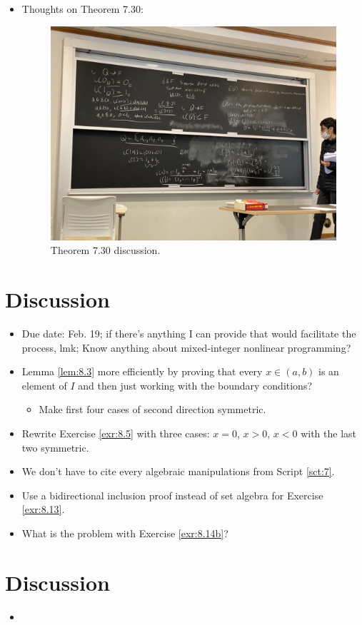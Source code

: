 \documentclass{report}
\begin{document}
\begin{itemize}
    \item {}Thoughts on Theorem 7.30:
    \begin{figure}[h!]
        \centering
        \includegraphics[width=0.5\linewidth]{ExtFiles/theorem7-30.JPG}
        \caption{Theorem 7.30 discussion.}
        \label{fig:theorem7-30}
    \end{figure}
\end{itemize}






\section{Discussion}
\begin{itemize}
    \item {}Due date: Feb. 19; if there's anything I can provide that would facilitate the process, lmk; Know anything about mixed-integer nonlinear programming?
    \item Lemma \ref{lem:8.3} more efficiently by proving that every $x\in(a,b)$ is an element of $I$ and then just working with the boundary conditions?
    \begin{itemize}
        \item Make first four cases of second direction symmetric.
    \end{itemize}
    \item Rewrite Exercise \ref{exr:8.5} with three cases: $x=0$, $x>0$, $x<0$ with the last two symmetric.
    \item We don't have to cite every algebraic manipulations from Script \ref{sct:7}.
    \item {}Use a bidirectional inclusion proof instead of set algebra for Exercise \ref{exr:8.13}.
    \item What is the problem with Exercise \ref{exr:8.14b}?
\end{itemize}






\section{Discussion}
\begin{itemize}
    \item 
\end{itemize}
\end{document}
